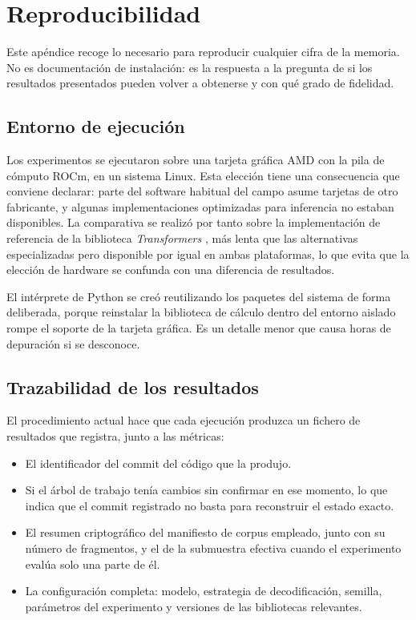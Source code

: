 \chapter{Reproducibilidad}
\label{ap:reproducibilidad}

Este apéndice recoge lo necesario para reproducir cualquier cifra de la memoria. No es
documentación de instalación: es la respuesta a la pregunta de si los resultados
presentados pueden volver a obtenerse y con qué grado de fidelidad.

\section{Entorno de ejecución}

Los experimentos se ejecutaron sobre una tarjeta gráfica AMD con la pila de cómputo ROCm,
en un sistema Linux. Esta elección tiene una consecuencia que conviene declarar: parte del
software habitual del campo asume tarjetas de otro fabricante, y algunas implementaciones
optimizadas para inferencia no estaban disponibles. La comparativa se realizó por tanto
sobre la implementación de referencia de la biblioteca \emph{Transformers}
\cite{wolf2020transformers}, más lenta que las alternativas especializadas pero disponible
por igual en ambas plataformas, lo que evita que la elección de hardware se confunda con una
diferencia de resultados.

El intérprete de Python se creó reutilizando los paquetes del sistema de forma deliberada,
porque reinstalar la biblioteca de cálculo dentro del entorno aislado rompe el soporte de
la tarjeta gráfica. Es un detalle menor que causa horas de depuración si se desconoce.

\section{Trazabilidad de los resultados}

El procedimiento actual hace que cada ejecución produzca un fichero de resultados que
registra, junto a las métricas:

\begin{itemize}
  \item El identificador del commit del código que la produjo.
  \item Si el árbol de trabajo tenía cambios sin confirmar en ese momento, lo que indica
        que el commit registrado no basta para reconstruir el estado exacto.
  \item El resumen criptográfico del manifiesto de corpus empleado, junto con su número de
        fragmentos, y el de la submuestra efectiva cuando el experimento evalúa solo una
        parte de él.
  \item La configuración completa: modelo, estrategia de decodificación, semilla,
        parámetros del experimento y versiones de las bibliotecas relevantes.
\end{itemize}


